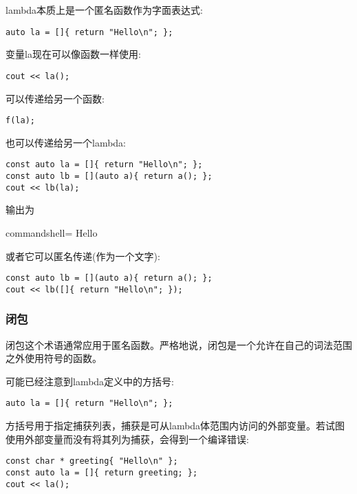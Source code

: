 
lambda本质上是一个匿名函数作为字面表达式:

\begin{lstlisting}[style=styleCXX]
auto la = []{ return "Hello\n"; };
\end{lstlisting}

变量la现在可以像函数一样使用:

\begin{lstlisting}[style=styleCXX]
cout << la();
\end{lstlisting}

可以传递给另一个函数:

\begin{lstlisting}[style=styleCXX]
f(la);
\end{lstlisting}

也可以传递给另一个lambda:

\begin{lstlisting}[style=styleCXX]
const auto la = []{ return "Hello\n"; };
const auto lb = [](auto a){ return a(); };
cout << lb(la);
\end{lstlisting}

输出为

\begin{tcblisting}{commandshell={}}
Hello
\end{tcblisting}

或者它可以匿名传递(作为一个文字):

\begin{lstlisting}[style=styleCXX]
const auto lb = [](auto a){ return a(); };
cout << lb([]{ return "Hello\n"; });
\end{lstlisting}

\subsubsection{闭包}

闭包这个术语通常应用于匿名函数。严格地说，闭包是一个允许在自己的词法范围之外使用符号的函数。

可能已经注意到lambda定义中的方括号:

\begin{lstlisting}[style=styleCXX]
auto la = []{ return "Hello\n"; };
\end{lstlisting}

方括号用于指定捕获列表，捕获是可从lambda体范围内访问的外部变量。若试图使用外部变量而没有将其列为捕获，会得到一个编译错误:

\begin{lstlisting}[style=styleCXX]
const char * greeting{ "Hello\n" };
const auto la = []{ return greeting; };
cout << la();
\end{lstlisting}

